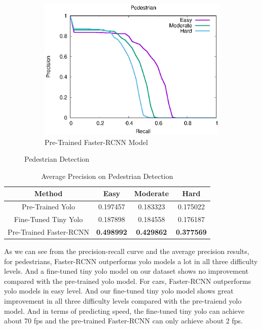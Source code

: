\begin{figure}[H]
\begin{subfigure}{.34\textwidth}
    \includegraphics[width=1.0\linewidth]{img/FRCNN_Nov_8/plot_valid/pedestrian_detection.eps}
    \caption{Pre-Trained Faster-RCNN Model}
\end{subfigure}
\caption{Pedestrian Detection}
\end{figure}

\begin{table}[h!]
\centering
\begin{tabular}{ c | c | c | c }
\hline
Method & Easy & Moderate & Hard \\
\hline \hline
Pre-Trained Yolo & 0.197457 & 0.183323 & 0.175022 \\
Fine-Tuned Tiny Yolo & 0.187898 & 0.184558 & 0.176187 \\
Pre-Trained Faster-RCNN & \bfseries 0.498992 & \bfseries 0.429862 & \bfseries 0.377569 \\
\hline
\end{tabular}
\caption{Average Precision on Pedestrian Detection}
\end{table}

As we can see from the precision-recall curve and the average precision results, for pedestrians, Faster-RCNN outperforms yolo models a lot in all three difficulty levels. And a fine-tuned tiny yolo model on our dataset shows no improvement compared with the pre-trained yolo model. For cars, Faster-RCNN outperforms yolo models in easy level. And our fine-tuned tiny yolo model shows great improvement in all three difficulty levels compared with the pre-traiend yolo model. And
in terms of predicting speed, the fine-tuned tiny yolo can achieve about 70 fps and the pre-trained Faster-RCNN can only achieve about 2 fps.
